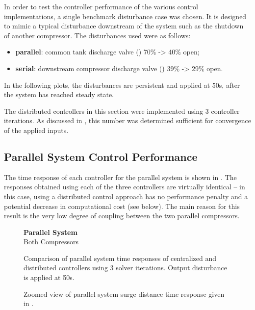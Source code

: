 In order to test the controller performance of the various control implementations, a single benchmark disturbance case was chosen.
It is designed to mimic a typical disturbance downstream of the system such as the shutdown of another compressor.
The disturbances used were as follows:

\begin{itemize}
  \item \textbf{parallel}: common tank discharge valve () 70\% -> 40\% open;
  \item \textbf{serial}: downstream compressor discharge valve () 39\% -> 29\% open.
\end{itemize}
In the following plots, the disturbances are persistent and applied at \u{50}{s}, after the system has reached steady state.

The distributed controllers in this section were implemented using 3 controller iterations. 
As discussed in \cite{Jones2016}, this number was determined sufficient for convergence of the applied inputs.

\subsection{Parallel System Control Performance}
The time response of each controller for the parallel system is shown in .
The responses obtained using each of the three controllers are virtually identical -- in this case, using a distributed control approach has no performance penalty and a potential decrease in computational cost (see below).
The main reason for this result is the very low degree of coupling between the two parallel compressors.


\begin{figure}
  {\centering\small\textbf{Parallel System}\\Both Compressors\\[0.5em]}
  \resizebox{\linewidth}{!}{%
    
  }
  \caption[Time response of parallel system.]{Comparison of parallel system time responses of centralized and distributed controllers using 3 solver iterations. Output disturbance is applied at \u{50}{s}.}
  \label{fig:res:parallel-timeresp}
\end{figure}

\begin{figure}
  \centering
  \resizebox{0.5\linewidth}{!}{%
    
  }
  \caption[Zoomed view of surge distance time response of parallel system.]{Zoomed view of parallel system surge distance time response given in .}
  \label{fig:res:parallel-sd-zoom}
\end{figure}

